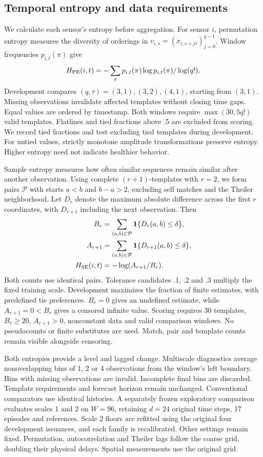 \documentclass{llncs}
\begin{document}
\subsection{Temporal entropy and data requirements}
We calculate each sensor's entropy before aggregation. For sensor $i$,
permutation entropy measures the diversity of orderings in
$v_{i,s}=(x_{i,s+j\tau})_{j=0}^{q-1}$. Window frequencies $p_{i,t}(\pi)$ give
\begin{equation}
 H_{\rm PE}(i,t)=-\sum_\pi p_{i,t}(\pi)\log p_{i,t}(\pi)/\log(q!).
 \label{eq:pe}
\end{equation}
Development compares $(q,\tau)=(3,1),(3,2),(4,1)$, starting from $(3,1)$.
Missing observations invalidate affected templates without closing time gaps.
Equal values are ordered by timestamp. Both windows require
$\max(30,5q!)$ valid templates. Flatlines and tied fractions above .5 are
excluded from scoring. We record tied fractions and test excluding tied
templates during development. For untied values, strictly monotone amplitude
transformations preserve entropy. Higher entropy need not indicate healthier
behavior.

Sample entropy measures how often similar sequences remain similar after
another observation. Using complete $(r+1)$-templates with $r=2$,
we form pairs $\mathcal P$ with starts $a<b$ and $b-a>2$, excluding
self matches and the Theiler neighborhood. Let $D_r$ denote the
maximum absolute difference across the first $r$ coordinates, with
$D_{r+1}$ including the next observation. Then
\begin{align}
B_r&=\sum_{(a,b)\in\mathcal P}\mathbf1\{D_r(a,b)\leq\delta\},\\
 A_{r+1}&=\sum_{(a,b)\in\mathcal P}\mathbf1\{D_{r+1}(a,b)\leq\delta\},\\
 H_{\rm SE}(i,t)&=-\log(A_{r+1}/B_r).\label{eq:se}
\end{align}
Both counts use identical pairs. Tolerance candidates .1, .2 and .3 multiply
the fixed training scale. Development maximizes the fraction of finite
estimates, with predefined tie preferences. $B_r=0$ gives an undefined
estimate, while $A_{r+1}=0<B_r$ gives a censored infinite value.
Scoring requires 30 templates, $B_r\geq20$, $A_{r+1}>0$, nonconstant
data and valid comparison windows. No pseudocounts or finite substitutes
are used. Match, pair and template counts remain visible alongside censoring.

Both entropies provide a level and lagged change. Multiscale diagnostics
average nonoverlapping bins of 1, 2 or 4 observations from the window's
left boundary. Bins with missing observations are invalid. Incomplete
final bins are discarded. Template requirements and forecast horizon
remain unchanged. Conventional comparators use identical histories.
A separately frozen exploratory comparison evaluates scales 1 and 2 on
$W=96$, retaining $d=24$ original time steps, 17 episodes and references.
Scale 2 floors are refitted using the original four development issuances,
and each family is recalibrated. Other settings remain fixed. Permutation,
autocorrelation and Theiler lags follow the coarse grid, doubling their
physical delays. Spatial measurements use the original grid.
\end{document}
